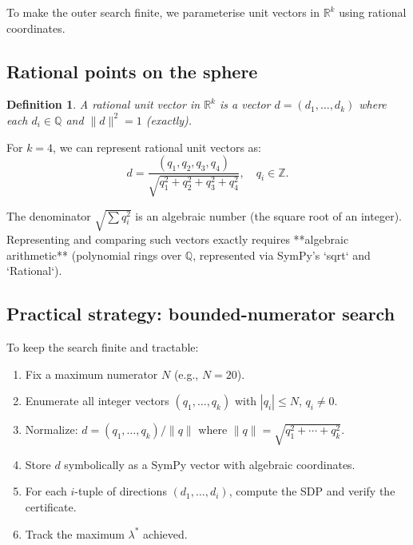 \documentclass[12pt,a4paper]{article}
\newtheorem{definition}{Definition}
\begin{document}
To make the outer search finite, we parameterise unit vectors in $\mathbb{R}^k$ using
rational coordinates.

\subsection*{Rational points on the sphere}

\begin{definition}
  A \emph{rational unit vector} in $\mathbb{R}^k$ is a vector $d = (d_1, \ldots, d_k)$
  where each $d_i \in \mathbb{Q}$ and $\|d\|^2 = 1$ (exactly).
\end{definition}

For $k=4$, we can represent rational unit vectors as:
\[
  d = \frac{(q_1, q_2, q_3, q_4)}{\sqrt{q_1^2 + q_2^2 + q_3^2 + q_4^2}},
  \quad q_i \in \mathbb{Z}.
\]

The denominator $\sqrt{\sum q_i^2}$ is an algebraic number (the square root of an integer).
Representing and comparing such vectors exactly requires **algebraic arithmetic** (polynomial
rings over $\mathbb{Q}$, represented via SymPy's `sqrt` and `Rational`).

\subsection*{Practical strategy: bounded-numerator search}

To keep the search finite and tractable:

\begin{enumerate}
  \item Fix a maximum numerator $N$ (e.g., $N=20$).

  \item Enumerate all integer vectors $(q_1, \ldots, q_k)$ with $|q_i| \leq N$, $q_i \neq 0$.

  \item Normalize: $d = (q_1, \ldots, q_k) / \|q\|$ where $\|q\| = \sqrt{q_1^2 + \cdots + q_k^2}$.

  \item Store $d$ symbolically as a SymPy vector with algebraic coordinates.

  \item For each $i$-tuple of directions $(d_1, \ldots, d_i)$, compute the SDP and verify
    the certificate.

  \item Track the maximum $\lambda^*$ achieved.
\end{enumerate}
\end{document}
